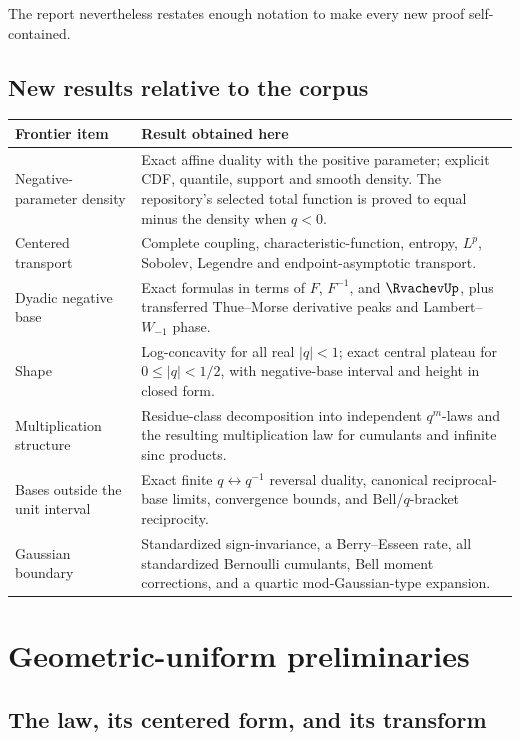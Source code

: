 \documentclass[11pt]{article}
\theoremstyle{definition}
\begin{document}
The report nevertheless restates enough notation to make every new proof self-contained.

\subsection{New results relative to the corpus}

\begin{longtable}{@{}p{}p{}@{}}
\toprule
Frontier item & Result obtained here \\
\midrule
\endhead
Negative-parameter density & Exact affine duality with the positive parameter; explicit
CDF, quantile, support and smooth density.  The repository's selected total function is
proved to equal minus the density when \(q<0\). \\
Centered transport & Complete coupling, characteristic-function, entropy, \(L^p\),
Sobolev, Legendre and endpoint-asymptotic transport. \\
Dyadic negative base & Exact formulas in terms of \(F\), \(F^{-1}\), and \(\RvachevUp\), plus
transferred Thue--Morse derivative peaks and Lambert--\(W_{-1}\) phase. \\
Shape & Log-concavity for all real \(\lvert q\rvert<1\); exact central plateau for
\(0\le \lvert q\rvert<1/2\), with negative-base interval and height in closed form. \\
Multiplication structure & Residue-class decomposition into independent
\(q^m\)-laws and the resulting multiplication law for cumulants and infinite sinc
products. \\
Bases outside the unit interval & Exact finite \(q\leftrightarrow q^{-1}\) reversal
duality, canonical reciprocal-base limits, convergence bounds, and Bell/$q$-bracket
reciprocity. \\
Gaussian boundary & Standardized sign-invariance, a Berry--Esseen rate, all
standardized Bernoulli cumulants, Bell moment corrections, and a quartic
mod-Gaussian-type expansion. \\
\bottomrule
\end{longtable}

\section{Geometric-uniform preliminaries}

\subsection{The law, its centered form, and its transform}
\end{document}
